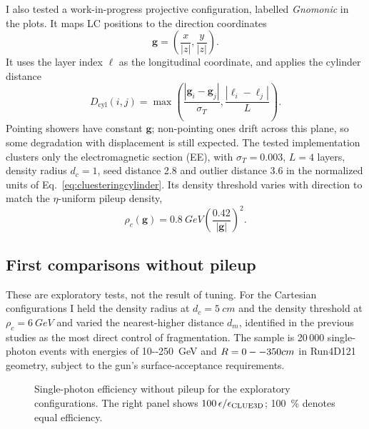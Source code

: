 I also tested a work-in-progress projective configuration, labelled
\emph{Gnomonic} in the plots. It maps LC positions to the direction coordinates
\begin{equation}
 \mathbf{g}=\left(\frac{x}{|z|},\frac{y}{|z|}\right).
\end{equation}
It uses the layer index $\ell$ as the longitudinal coordinate, and applies the cylinder distance
\begin{equation}
 D_{\mathrm{cyl}}(i,j)=\max\!\left(
 \frac{|\mathbf{g}_i-\mathbf{g}_j|}{\sigma_T},
 \frac{|\ell_i-\ell_j|}{L}\right).
 \label{eq:cluesteringcylinder}
\end{equation}
Pointing showers have constant $\mathbf{g}$; non-pointing ones drift across this
plane, so some degradation with displacement is still expected. The tested
implementation clusters only the electromagnetic section (EE), with
$\sigma_T=0.003$, $L=4$ layers, density radius $d_c=1$, seed distance 2.8 and
outlier distance 3.6 in the normalized units of
Eq.~\eqref{eq:cluesteringcylinder}. Its density threshold varies with direction
to match the $\eta$-uniform pileup density,
\begin{equation}
 \rho_c(\mathbf{g})=\SI{0.8}{GeV}
       \left(\frac{0.42}{|\mathbf{g}|}\right)^2.
\end{equation}

\subsection{First comparisons without pileup}

These are exploratory tests, not the result of tuning. For the Cartesian
configurations I held the density radius at $d_c=\SI{5}{cm}$ and the density threshold
at $\rho_c=\SI{6}{GeV}$ and varied the nearest-higher distance $d_m$, identified in
the previous studies as the most direct control of fragmentation. The sample is 20\,000
single-photon events with energies of \SI{10--250}{GeV} and $R=0--350 cm$ in
Run4D121 geometry, subject to the gun's surface-acceptance requirements.

\begin{figure}[!tp]
  \centering
{}
  \caption{Single-photon efficiency without pileup for the exploratory
  \cluestering{} configurations. The right panel shows
  $100\,\epsilon/\epsilon_{\mathrm{CLUE3D{}}}$; \SI{100}{\%} denotes equal efficiency.}
  \label{fig:cluesteringefficiencies}
\end{figure}

